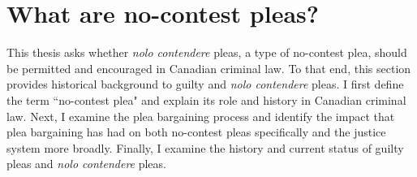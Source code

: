 \chapter{What are no-contest pleas?}

This thesis asks whether \textit{nolo contendere} pleas, a type of no-contest plea, should be permitted and encouraged in Canadian criminal law. To that end, this section provides historical background to guilty and \textit{nolo contendere} pleas. I first define the term ``no-contest plea" and explain its role and history in Canadian criminal law. Next, I examine the plea bargaining process and identify the impact that plea bargaining has had on both no-contest pleas specifically and the justice system more broadly. Finally, I examine the history and current status of guilty pleas and \textit{nolo contendere} pleas.